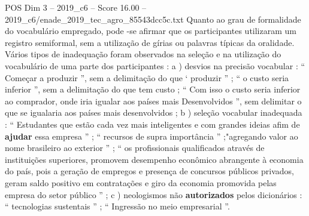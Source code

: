 \begin{textsample}{POS Dim 3 – 2019\_c6 – Score 16.00 – 2019\_c6/enade\_2019\_tec\_agro\_85543dcc5c.txt}
Quanto ao grau de formalidade do vocabulário empregado, pode -se afirmar que os participantes utilizaram um registro semiformal, sem a utilização de gírias ou palavras típicas da oralidade.
Vários tipos de inadequação foram observados na seleção e na utilização do vocabulário de uma parte dos participantes : a ) desvios na precisão vocabular : “ Começar a produzir ”, sem a delimitação do que ‘ produzir ” ; “ o custo seria inferior ”, sem a delimitação do que tem custo ; “ Com isso o custo seria inferior ao comprador, onde iria igualar aos países mais Desenvolvidos ”, sem delimitar o que se igualaria aos países mais desenvolvidos ; b ) seleção vocabular inadequada : “ Estudantes que estão cada vez mais inteligentes e com grandes ideias afim de \textbf{ajudar} essa empresa ” ; “ recursos de supra importância ” ;"agregando valor ao nome brasileiro ao exterior ” ; “ os profissionais qualificados através de instituições superiores, promovem desempenho econômico abrangente à economia do país, pois a geração de empregos e presença de concursos públicos privados, geram saldo positivo em contratações e giro da economia promovida pelas empresa do setor público ” ; c ) neologismos não \textbf{autorizados} pelos dicionários : “ tecnologias sustentais ” ; “ Ingressão no meio empresarial ”.

\end{textsample}
